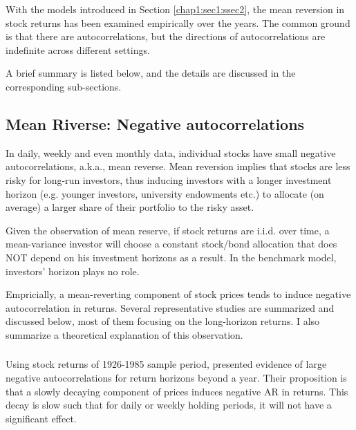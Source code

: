 With the models introduced in Section \ref{chap1:sec1:ssec2}, the mean reversion in stock returns
has been examined empirically over the years. The common ground is that there are autocorrelations,
but the directions of autocorrelations are indefinite across different settings.

A brief summary is listed below, and the details are discussed in the corresponding sub-sections.

\subsection{Mean Riverse: Negative autocorrelations}\label{chap1:sec2:ssec1}
In daily, weekly and even monthly data, individual stocks have small negative autocorrelations, a.k.a., mean reverse. Mean reversion implies that
stocks are less risky for long-run investors, thus inducing investors with a longer investment horizon (e.g. younger investors, university endowments etc.) to allocate (on average)
a larger share of their portfolio to the risky asset.

Given the observation of mean reserve, if stock returns are i.i.d. over time, a mean-variance investor will choose a constant stock/bond allocation that does NOT depend on his investment horizons as a result.
In the benchmark model, investors' horizon plays no role.

Empricially, a mean-reverting component of stock prices tends to induce negative autocorrelation in returns. Several representative studies are summarized and discussed below, most of them focusing on the long-horizon returns.
I also summarize a theoretical explanation of this observation.

\subsubsection{\citet{fama1988permanent}}\label{chap1:sec2:ssec1:paper1}
Using stock returns of 1926-1985 sample period, \citeauthor{fama1988permanent} presented evidence of large negative autocorrelations for return horizons beyond a year. Their proposition is that a slowly decaying component of prices
induces negative AR in returns. This decay is slow such that for daily or weekly holding periods, it will not have a significant effect. 

